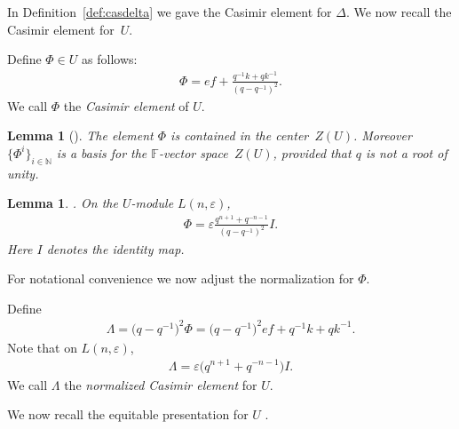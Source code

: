 \documentclass[pdftex]{sigma}
\numberwithin{equation}{section}
\newtheorem{Lemma}[Theorem]{Lemma}
\begin{document}
In Def\/inition~\ref{def:casdelta} we gave the Casimir element
for $\Delta$. We now recall the Casimir element
for~$U$.

\begin{Definition}
\label{def:casu}
Def\/ine
 $\Phi \in
U$ as follows:
\begin{gather*}
\Phi = ef +\frac{q^{-1}k + qk^{-1}}{(q-q^{-1})^2}.
\end{gather*}
We call $\Phi$ the {\it Casimir element} of
$U$.
\end{Definition}

\begin{Lemma}[]
The element
$\Phi$ is contained in the center~$Z(U)$.
Moreover $\lbrace \Phi^i\rbrace_{i \in \mathbb N}$ is a basis
for the $\mathbb F$-vector space~$Z(U)$,
 provided that $q$ is not a root of unity.
\end{Lemma}





\begin{Lemma}
\label{lem:normmeaning}
{\rm \cite[Lemma~2.7]{jantzen}.}
On the
$U$-module
$L(n,\varepsilon)$,
\begin{gather*}
\Phi  =  \varepsilon \frac{q^{n+1}+q^{-n-1}}{(q-q^{-1})^2} I.
\end{gather*}
Here $I$ denotes the identity map.
\end{Lemma}

For notational convenience we now adjust the
normalization for $\Phi$.

\begin{Definition}
\label{def:norm}
Def\/ine
\begin{gather}
\Lambda  = \big(q-q^{-1}\big)^2 \Phi
= \big(q-q^{-1}\big)^2ef +q^{-1}k + qk^{-1}.
\label{eq:lambdaform}
\end{gather}
Note that on
$L(n,\varepsilon)$,
\begin{gather*}
\Lambda  =  \varepsilon\big(q^{n+1}+q^{-n-1}\big)I.
\end{gather*}
We call
$\Lambda$ the {\it normalized Casimir element} for
$U$.
\end{Definition}


We now recall the equitable presentation for
$U$ \cite{equit}.
\end{document}
